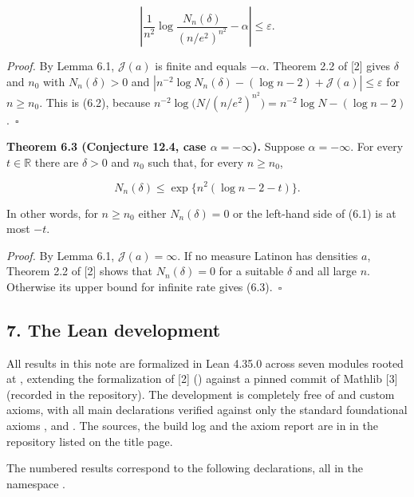 \documentclass[english,11pt,a4paper]{article}
\begin{document}
\nopagebreak[4]
\[\left|\frac1{n^2}\log\frac{N_n(\delta)}{(n/e^2)^{n^2}}-\alpha\right|\le\varepsilon.\tag{6.2}\]

\emph{Proof.} By Lemma 6.1, \(\mathcal J(a)\) is finite and equals \(-\alpha\). Theorem 2.2 of {[}2{]} gives \(\delta\) and \(n_0\) with \(N_n(\delta)>0\) and \(|n^{-2}\log N_n(\delta)-(\log n-2)+\mathcal J(a)|\le\varepsilon\) for \(n\ge n_0\). This is (6.2), because \(n^{-2}\log\bigl(N/(n/e^2)^{n^2}\bigr)=n^{-2}\log N-(\log n-2)\).~\(\square\)

\textbf{Theorem 6.3 (Conjecture 12.4, case \(\alpha=-\infty\)).} Suppose \(\alpha=-\infty\). For every \(t\in\mathbb R\) there are \(\delta>0\) and \(n_0\) such that, for every \(n\ge n_0\),

\nopagebreak[4]
\[N_n(\delta)\le\exp\bigl\{n^2(\log n-2-t)\bigr\}.\tag{6.3}\]

In other words, for \(n\ge n_0\) either \(N_n(\delta)=0\) or the left-hand side of (6.1) is at most \(-t\).

\emph{Proof.} By Lemma 6.1, \(\mathcal J(a)=\infty\). If no measure Latinon has densities \(a\), Theorem 2.2 of {[}2{]} shows that \(N_n(\delta)=0\) for a suitable \(\delta\) and all large \(n\). Otherwise its upper bound for infinite rate gives (6.3).~\(\square\)

\subsection{7. The Lean development}\label{the-lean-development}

All results in this note are formalized in Lean 4.35.0 across seven modules rooted at \mbox{}, extending the formalization of {[}2{]} (\mbox{}) against a pinned commit of Mathlib {[}3{]} (recorded in the repository). The development is completely free of \mbox{} and custom axioms, with all main declarations verified against only the standard foundational axioms \mbox{}, \mbox{} and \mbox{}. The sources, the build log and the axiom report are in  in the repository listed on the title page.

The numbered results correspond to the following declarations, all in the namespace \mbox{}.
\end{document}
